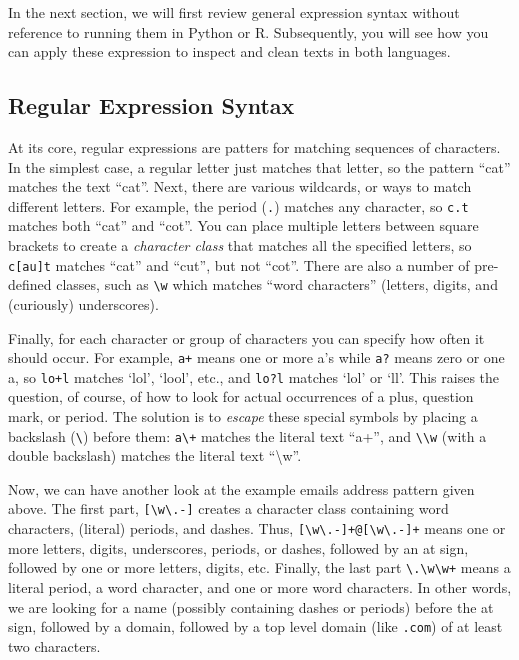 In the next section, we will first review general expression syntax without reference to running them in Python or R.
Subsequently, you will see how you can apply these expression to inspect and clean texts in both languages.

\subsection{Regular Expression Syntax}

At its core, regular expressions are patters for matching sequences of characters.
In the simplest case, a regular letter just matches that letter, so the pattern ``cat'' matches the text ``cat''.
Next, there are various wildcards, or ways to match different letters.
For example, the period (\verb|.|) matches any character, so \verb|c.t| matches both ``cat'' and ``cot''.
You can place multiple letters between square brackets to create a \emph{character class} that matches all the specified letters, so \verb|c[au]t| matches ``cat'' and ``cut'', but not ``cot''.
There are also a number of pre-defined classes, such as \verb|\w| which matches ``word characters'' (letters, digits, and (curiously) underscores).

Finally, for each character or group of characters you can specify how often it should occur.
For example, \verb|a+| means one or more a's while \verb|a?| means zero or one a, so \verb|lo+l| matches `lol', `lool', etc.,
and \verb|lo?l| matches `lol' or `ll'.
This raises the question, of course, of how to look for actual occurrences of a plus, question mark, or period.
The solution is to \emph{escape} these special symbols by placing a backslash (\verb|\|) before them:
\verb|a\+| matches the literal text ``a+'', and \verb|\\w| (with a double backslash) matches the literal text ``\textbackslash w''.

Now, we can have another look at the example emails address pattern given above.
The first part, \verb|[\w\.-]| creates a character class containing word characters, (literal) periods, and dashes.
Thus, \verb|[\w\.-]+@[\w\.-]+| means one or more letters, digits, underscores, periods, or dashes, followed by an at sign,
followed by one or more letters, digits, etc.
Finally, the last part \verb|\.\w\w+| means a literal period, a word character, and one or more word characters.
In other words, we are looking for a name (possibly containing dashes or periods) before the at sign,
followed by a domain, followed by a top level domain (like \verb|.com|) of at least two characters.

